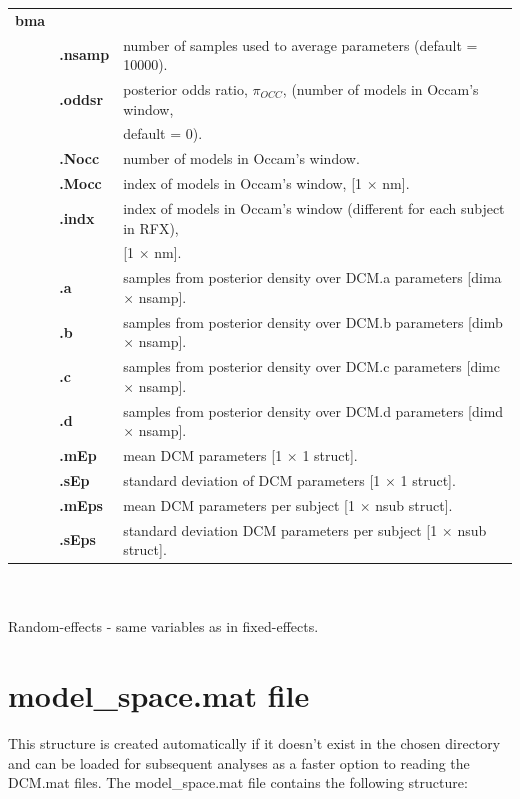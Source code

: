 \begin{tabular}{ l l l }
\bf{bma} & & \\
& \bf{.nsamp} &	 number of samples used to average parameters (default = 10000). \\
& \bf{.oddsr} & posterior odds ratio, $\pi_{OCC}$, (number of models in Occam's window, \\
& & default = 0). \\
& \bf{.Nocc} & number of models in Occam's window. \\
& \bf{.Mocc} & index of models in Occam's window, [1 $\times$ nm]. \\  
& \bf{.indx} & index of models in Occam's window (different for each subject in RFX),\\
& &  [1 $\times$ nm]. \\
& \bf{.a} & samples from posterior density over DCM.a parameters [dima $\times$ nsamp]. \\
& \bf{.b} & samples from posterior density over DCM.b parameters [dimb $\times$ nsamp]. \\
& \bf{.c} & samples from posterior density over DCM.c parameters [dimc $\times$ nsamp]. \\
& \bf{.d} & samples from posterior density over DCM.d parameters [dimd $\times$ nsamp]. \\
& \bf{.mEp} & mean DCM parameters [1 $\times$ 1 struct]. \\
& \bf{.sEp} & standard deviation of DCM parameters [1 $\times$ 1 struct]. \\
& \bf{.mEps} & mean DCM parameters per subject [1 $\times$ nsub struct]. \\
& \bf{.sEps} & standard deviation DCM parameters per subject [1 $\times$ nsub struct]. \\
\end{tabular}\\\\

Random-effects - same variables as in fixed-effects.

\section{model\_space.mat file}

This structure is created automatically if it doesn't exist in the chosen directory and can be loaded for subsequent analyses as a faster option to reading the DCM.mat files. The model\_space.mat file contains the following structure:\\\\

